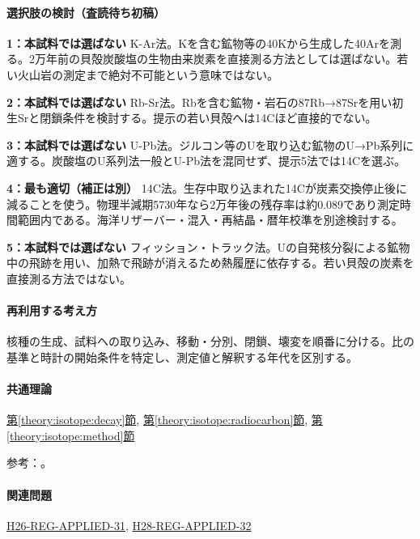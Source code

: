 \paragraph{選択肢の検討（査読待ち初稿）}\mbox{}\par

\noindent\textbf{1：本試料では選ばない} K-Ar法。Kを含む鉱物等の40Kから生成した40Arを測る。2万年前の貝殻炭酸塩の生物由来炭素を直接測る方法としては選ばない。若い火山岩の測定まで絶対不可能という意味ではない。\par

\noindent\textbf{2：本試料では選ばない} Rb-Sr法。Rbを含む鉱物・岩石の87Rb→87Srを用い初生Srと閉鎖条件を検討する。提示の若い貝殻へは14Cほど直接的でない。\par

\noindent\textbf{3：本試料では選ばない} U-Pb法。ジルコン等のUを取り込む鉱物のU→Pb系列に適する。炭酸塩のU系列法一般とU-Pb法を混同せず、提示5法では14Cを選ぶ。\par

\noindent\textbf{4：最も適切（補正は別）} 14C法。生存中取り込まれた14Cが炭素交換停止後に減ることを使う。物理半減期5730年なら2万年後の残存率は約0.089であり測定時間範囲内である。海洋リザーバー・混入・再結晶・暦年校準を別途検討する。\par

\noindent\textbf{5：本試料では選ばない} フィッション・トラック法。Uの自発核分裂による鉱物中の飛跡を用い、加熱で飛跡が消えるため熱履歴に依存する。若い貝殻の炭素を直接測る方法ではない。\par

\paragraph{再利用する考え方} 核種の生成、試料への取り込み、移動・分別、閉鎖、壊変を順番に分ける。比の基準と時計の開始条件を特定し、測定値と解釈する年代を区別する。

\paragraph{共通理論} \hyperref[theory:isotope:decay]{第\ref*{theory:isotope:decay}節}, \hyperref[theory:isotope:radiocarbon]{第\ref*{theory:isotope:radiocarbon}節}, \hyperref[theory:isotope:method]{第\ref*{theory:isotope:method}節}

\par 参考：\cite{iso_radiometric,iso_shell}。

\paragraph{関連問題} \hyperref[q:h26-reg-applied-31]{H26-REG-APPLIED-31}, \hyperref[q:h28-reg-applied-32]{H28-REG-APPLIED-32}

